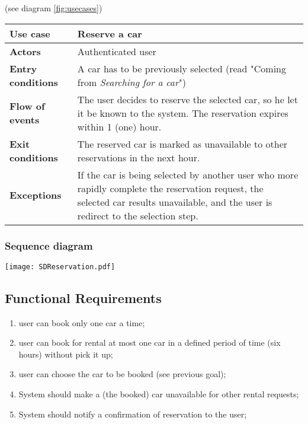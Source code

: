 \documentclass{scrreprt}
\begin{document}
 (see diagram \vref{fig:usecases})

\begin{center}
\begin{tabularx}{\columnwidth}{>{\bfseries}lX}
\toprule
Use case & Reserve a car\\
\midrule
Actors & Authenticated user\\
\midrule
Entry conditions & A car has to be previously selected (read "Coming from \emph{Searching for a car}")\\
\midrule
Flow of events & The user decides to reserve the selected car, so he let it be known to the system. The reservation expires within 1 (one) hour.\\
\midrule
Exit conditions & The reserved car is marked as unavailable to other reservations in the next hour.\\
\midrule
Exceptions & If the car is being selected by another user who more rapidly complete the reservation request, the selected car results unavailable, and the user is redirect to the selection step.\\
\bottomrule
\end{tabularx}
\end{center}

\subsubsection{Sequence diagram}
\begin{center}
\texttt{[image: SDReservation.pdf]}
\end{center}

\subsection{Functional Requirements}
\begin{enumerate}[label=R\arabic*.,resume]
\item user can book only one car a time;
\item user can book for rental at most one car in a defined period of time (six hours) without pick it up;
\item user can choose the car to be booked (see previous goal);
\item System should make a (the booked) car unavailable for other rental requests;
\item System should notify a confirmation of reservation to the user;
\end{enumerate}
\end{document}

